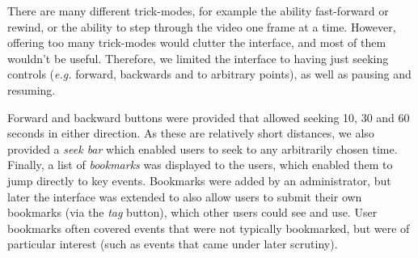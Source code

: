 There are many different trick-modes, for example the ability fast-forward or rewind, or the ability to step through the video one frame at a time. However, offering too many trick-modes would clutter the interface, and most of them wouldn't be useful. Therefore, we limited the interface to having just seeking controls (\emph{e.g.} forward, backwards and to arbitrary points), as well as pausing and resuming.

Forward and backward buttons were provided that allowed seeking 10, 30 and 60 seconds in either direction. As these are relatively short distances, we also provided a \emph{seek bar} which enabled users to seek to any arbitrarily chosen time. Finally, a list of \emph{bookmarks} was displayed to the users, which enabled them to jump directly to key events. Bookmarks were added by an administrator, but later the interface was extended to also allow users to submit their own bookmarks (via the \emph{tag} button), which other users could see and use. User bookmarks often covered events that were not typically bookmarked, but were of particular interest (such as events that came under later scrutiny).
%
%
%
%
%
%
%
%
%
%
%

